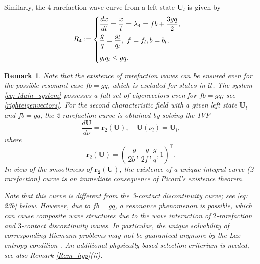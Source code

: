 \documentclass[11pt]{article}
\numberwithin{equation}{section}
\newtheorem{counter example}[theorem]{Counter Example}
\newtheorem{remark}[theorem] {Remark}
\begin{document}
{Similarly, the $4$-rarefaction wave curve  from a left state $\mathbf{U}_l$ is given  by
\begin{align} \label{R4} R_4:=
    \begin{cases}
        \dfrac{dx}{dt}=\dfrac{x}{t}=\lambda_4=fb+\dfrac{3gq}{2},\vspace{0.2 cm}\\
        \dfrac{g}{q}=\dfrac{g_l}{q_l},~f=f_l, b=b_l,\vspace{0.2 cm}\\
        g_lq_l\leq gq.
    \end{cases}
\end{align}
\begin{remark}\label{rem_resonance}
Note that the existence of rarefaction waves can be ensured even for the possible resonant case $fb=gq$, which is excluded for states in  $\mathcal U$. The system \eqref{eq: Main_system} possesses a full set of eigenvectors even for $fb=gq$; see \eqref{righteigenvectors}. For the second characteristic field with a given left state $\mathbf{U}_l$ and $fb=gq$, the 2-rarefaction curve is obtained by solving the IVP
\[
\dfrac{d\mathbf{U}}{d \nu}=\mathbf{r}_2(\mathbf{U}), \quad \mathbf{U}(\nu_l)=\mathbf{U}_l, 
\]
where \[
\mathbf{r}_2(\mathbf{U})=\left(\dfrac{-g}{2b}, \dfrac{-g}{2f}, \dfrac{g}{q}, 1\right)^\top.
\]
In view of the smoothness of $\mathbf{r_2}(\mathbf{U})$, the existence of a unique integral curve (2-rarefaction) curve is an immediate consequence of Picard's existence theorem.

Note that this curve is different from the 3-contact discontinuity curve; see \eqref{eq: 23b} below. However, due to $fb=gq$, a resonance phenomenon is possible, which can cause composite wave structures due to the wave interaction of $2$-rarefaction and $3$-contact discontinuity waves. In particular, the unique solvability of corresponding Riemann problems may not be guaranteed anymore by the Lax entropy condition \cite{hu1998riemann, goatin_resonance}. An additional physically-based selection criterium  is needed, see also Remark \ref{Rem_hyp}(ii). 
\end{remark}
}
\end{document}

